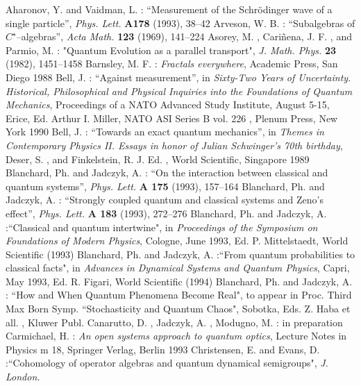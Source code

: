 \documentclass[12pt]{article}
\begin{document}
\begin{thebibliography}{99}
 Aharonov,  Y.  and Vaidman,  L.  : ``Measurement of the Schr\"odinger
wave of a single particle'', {\em Phys.  Lett.  }{\bf A178} (1993), 38--42
 Arveson,  W.  B.  : ``Subalgebras of $C^{\star}$--algebras'', 
{\em Acta Math. }{\bf 123} (1969), 141--224
 Asorey,  M. ,  Cari\~nena,  J. F. ,  and Parmio,  M. : 
"Quantum Evolution as a parallel transport",  {\em J. Math. Phys. }{\bf 23} (1982), 
1451--1458
 Barnsley,  M. F. : {\em Fractals everywhere},  Academic Press,  San
Diego 1988
 Bell,  J. : ``Against measurement'', in
{\em Sixty-Two Years of Uncertainty. Historical, Philosophical and
Physical Inquiries into the Foundations of Quantum Mechanics}, Proceedings
of a NATO Advanced Study Institute, August 5-15, Erice, Ed. Arthur I. Miller,
NATO ASI Series B vol. 226 , Plenum Press, New York 1990 
 Bell,  J. : ``Towards an exact quantum mechanics'',  in
{\em Themes in Contemporary Physics II.  Essays in honor of Julian
Schwinger's 70th birthday},  Deser,  S. ,  and Finkelstein,  R. J.  Ed. , 
World Scientific,  Singapore 1989
 Blanchard,  Ph.  and Jadczyk,  A. : ``On the interaction
between classical and quantum systems'', {\em Phys. Lett. }{\bf A
175} (1993), 157--164
 Blanchard,  Ph.  and Jadczyk,  A. : ``Strongly coupled
quantum and classical systems and Zeno's effect'', {\em
Phys. Lett. }{\bf A 183} (1993), 272--276
  Blanchard,  Ph.  and Jadczyk,  A. :``Classical and quantum
intertwine",  in {\em Proceedings of the Symposium on Foundations of
Modern Physics},  Cologne,  June 1993,  Ed.  P.  Mittelstaedt,  World
Scientific  (1993)
 Blanchard,  Ph.  and Jadczyk,  A. :``From quantum
probabilities to classical facts",  in {\em Advances in Dynamical
Systems and Quantum Physics},  Capri,  May 1993,  Ed.  R.  Figari,  World
Scientific  (1994) 
 Blanchard,  Ph.  and Jadczyk,  A. : ``How and
When Quantum Phenomena Become Real",  to appear in Proc. 
Third Max Born Symp. ``Stochasticity and Quantum Chaos", 
Sobotka,  Eds.  Z.  Haba et all. ,  Kluwer Publ. 
Canarutto,  D. ,  Jadczyk,  A. ,  Modugno,  M. :  in preparation
 Carmichael,  H. : 
{\em An open systems approach to quantum optics}, 
Lecture Notes in Physics m 18,  Springer Verlag,  Berlin 1993
 Christensen,  E.  and Evans,  D. :``Cohomology of
operator algebras and quantum dynamical semigroups",  {\em J.  London. 
}
\end{thebibliography}
\end{document}
